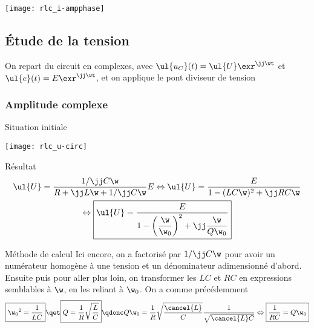\documentclass[../main/main.tex]{subfiles}
\begin{document}
\vspace{-20pt}
\begin{center}
    \texttt{[image: rlc\_i-ampphase]}
\end{center}

\subsection{Étude de la tension}
On repart du circuit en complexes, avec $\ul{u_C}(t) = \ul{U}\exr^{\jj\wt}$ et
$\ul{e}(t) = E\exr^{\jj\wt}$, et on applique le pont diviseur de tension

\subsubsection{Amplitude complexe}
\begin{rdefi}{Situation initiale}
    \vspace{-20pt}
    \begin{minipage}{0.40\linewidth}
        \begin{center}
            \texttt{[image: rlc\_u-circ]}
        \end{center}
    \end{minipage}
    \hfill
    \begin{minipage}{0.60\linewidth}
        \begin{lprop}{Résultat}
            \begin{gather*}
                \ul{U} = \frac{1/\jj C\w}{R + \jj L\w + 1/\jj C\w}E
                \Leftrightarrow
                \ul{U} = \frac{E}{1 - (LC\w)^2 + \jj RC\w}\\
                \Leftrightarrow
                \boxed{
                    \ul{U}
                        = \frac{E}{1 -
                                    \left( \dfrac{\w}{\w_0} \right)^2 +
                                    \jj\dfrac{\w}{Q\w_0}}
                    }
            \end{gather*}
        \end{lprop}
    \end{minipage}
\end{rdefi}
\begin{rdemo}{Méthode de calcul}
    Ici encore, on a factorisé par $1/\jj C\w$ pour avoir un numérateur homogène
    à une tension et
    un dénominateur adimensionné d'abord. Ensuite puis pour aller plus loin, on
    transformer les $LC$ et $RC$ en expressions semblables à $\w$, en les
    reliant à $\w_0$. On a comme précédemment
    \begin{gather*}
        \boxed{\w_0{}^2 = \frac{1}{LC}}
        \qet
        \boxed{Q = \frac{1}{R} \sqrt{\frac{L}{C}}}
        \qdonc
        Q\w_0 = \frac{1}{R} \sqrt{\frac{\cancel{L}}{C}} \frac{1}{\sqrt{\cancel{L}C}}
        \Leftrightarrow
        \boxed{ \frac{1}{RC} = Q\w_0}
    \end{gather*}
\end{rdemo}
\end{document}
